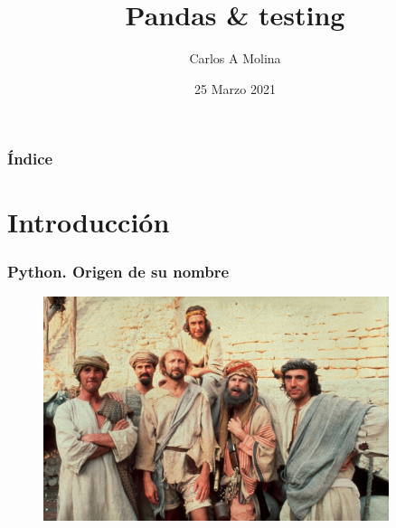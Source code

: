 \documentclass{beamer}
\title[Pandas \& testing]{Pandas \& testing} %
\author{Carlos A Molina}
\date{25 Marzo 2021}
\begin{document}
\begin{frame}
\titlepage %
\end{frame}

\begin{frame}
\frametitle{Índice}
\tableofcontents %
\end{frame}


\section{Introducción} %

\begin{frame}

\frametitle{Python. Origen de su nombre}

  \begin{figure}
    \centering
    \href{http://www.python.org/doc/faq/general/\#why-is-it-called-python}
      {\includegraphics[width=0.9\textwidth]{brian.jpeg}}
  \end{figure}

\end{frame}
\end{document}
